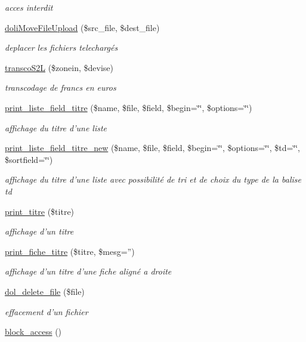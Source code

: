 \begin{CompactItemize}
\begin{CompactList}\small\item\em acces interdit \item\end{CompactList}\item 
\hyperlink{functions_8inc_8php_a23}{doli\-Move\-File\-Upload} (\$src\_\-file, \$dest\_\-file)
\begin{CompactList}\small\item\em deplacer les fichiers telecharg\'{e}s \item\end{CompactList}\item 
\hyperlink{functions_8inc_8php_a25}{transco\-S2L} (\$zonein, \$devise)
\begin{CompactList}\small\item\em transcodage de francs en euros \item\end{CompactList}\item 
\hyperlink{functions_8inc_8php_a26}{print\_\-liste\_\-field\_\-titre} (\$name, \$file, \$field, \$begin=\char`\"{}\char`\"{}, \$options=\char`\"{}\char`\"{})
\begin{CompactList}\small\item\em affichage du titre d'une liste \item\end{CompactList}\item 
\hyperlink{functions_8inc_8php_a27}{print\_\-liste\_\-field\_\-titre\_\-new} (\$name, \$file, \$field, \$begin=\char`\"{}\char`\"{}, \$options=\char`\"{}\char`\"{}, \$td=\char`\"{}\char`\"{}, \$sortfield=\char`\"{}\char`\"{})
\begin{CompactList}\small\item\em affichage du titre d'une liste avec possibilit\'{e} de tri et de choix du type de la balise td \item\end{CompactList}\item 
\hyperlink{functions_8inc_8php_a28}{print\_\-titre} (\$titre)
\begin{CompactList}\small\item\em affichage d'un titre \item\end{CompactList}\item 
\hyperlink{functions_8inc_8php_a29}{print\_\-fiche\_\-titre} (\$titre, \$mesg='')
\begin{CompactList}\small\item\em affichage d'un titre d'une fiche align\'{e} a droite \item\end{CompactList}\item 
\hyperlink{functions_8inc_8php_a30}{dol\_\-delete\_\-file} (\$file)
\begin{CompactList}\small\item\em effacement d'un fichier \item\end{CompactList}\item 
\hypertarget{functions_8inc_8php_a31}{
\hyperlink{functions_8inc_8php_a31}{block\_\-access} ()}
\label{functions_8inc_8php_a31}


\end{CompactItemize}
